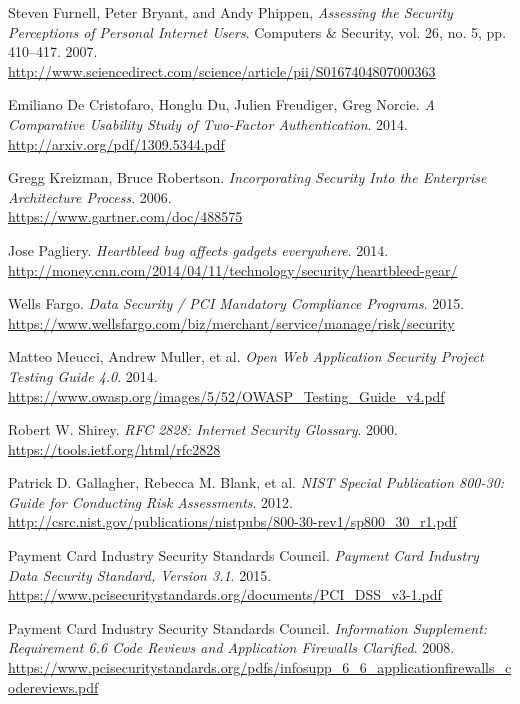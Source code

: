 \documentclass[a4paper,12pt]{article}
\begin{document}
\begin{thebibliography}{}
		Steven Furnell, Peter Bryant, and Andy Phippen, \textit{Assessing the Security Perceptions of Personal Internet Users}. Computers \& Security, vol. 26, no. 5, pp. 410–417. 2007.\\
		\url{http://www.sciencedirect.com/science/article/pii/S0167404807000363}
		
		Emiliano De Cristofaro, Honglu Du, Julien Freudiger, Greg Norcie. \textit{A Comparative Usability Study of Two-Factor Authentication}. 2014.\\
		\url{http://arxiv.org/pdf/1309.5344.pdf}
		
		Gregg Kreizman, Bruce Robertson. \textit{Incorporating Security Into the Enterprise Architecture Process}. 2006.\\
		\url{https://www.gartner.com/doc/488575}
		
		Jose Pagliery. \textit{Heartbleed bug affects gadgets everywhere}. 2014.\\
		\url{http://money.cnn.com/2014/04/11/technology/security/heartbleed-gear/}
		
		Wells Fargo. \textit{Data Security / PCI Mandatory Compliance Programs}. 2015.\\
		\url{https://www.wellsfargo.com/biz/merchant/service/manage/risk/security}
		
		Matteo Meucci, Andrew Muller, et al. \textit{Open Web Application Security Project Testing Guide 4.0}. 2014.\\
		\url{https://www.owasp.org/images/5/52/OWASP_Testing_Guide_v4.pdf}
		
		Robert W. Shirey. \textit{RFC 2828: Internet Security Glossary}. 2000.\\
		\url{https://tools.ietf.org/html/rfc2828}
		
		Patrick D. Gallagher, Rebecca M. Blank, et al. \textit{NIST Special Publication 800-30: Guide for Conducting Risk Assessments}. 2012.\\
		\url{http://csrc.nist.gov/publications/nistpubs/800-30-rev1/sp800_30_r1.pdf}
		
		Payment Card Industry Security Standards Council. \textit{Payment Card Industry Data Security Standard, Version 3.1}. 2015.\\
		\url{https://www.pcisecuritystandards.org/documents/PCI_DSS_v3-1.pdf}
		
		Payment Card Industry Security Standards Council. \textit{Information Supplement: Requirement 6.6 Code Reviews and Application Firewalls Clarified}. 2008.\\
		\url{https://www.pcisecuritystandards.org/pdfs/infosupp_6_6_applicationfirewalls_codereviews.pdf}
		

\end{thebibliography}
\end{document}
